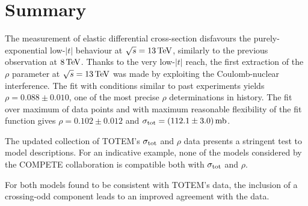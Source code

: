 \section{Summary}
\label{sec:summary}

The measurement of elastic differential cross-section disfavours the purely-exponential low-$|t|$ behaviour at $\sqrt s = 13\,{\rm TeV}$, similarly to the previous observation at $8\,{\rm TeV}$. Thanks to the very low-$|t|$ reach, the first extraction of the $\rho$ parameter at $\sqrt s = 13\,{\rm TeV}$ was made by exploiting the Coulomb-nuclear interference. The fit with conditions similar to past experiments yields $\rho = 0.088 \pm 0.010$, one of the most precise $\rho$ determinations in history. The fit over maximum of data points and with maximum reasonable flexibility of the fit function gives $\rho = 0.102 \pm 0.012$ and $\sigma_{\rm tot} = (112.1 \pm 3.0)\,{\rm mb}$.

The updated collection of TOTEM's $\sigma_{\rm tot}$ and $\rho$ data presents a stringent test to model descriptions. For an indicative example, none of the models considered by the COMPETE collaboration is compatible both with $\sigma_{\rm tot}$ and $\rho$.

For both models found to be consistent with TOTEM's data, the inclusion of a crossing-odd component leads to an improved agreement with the data.
